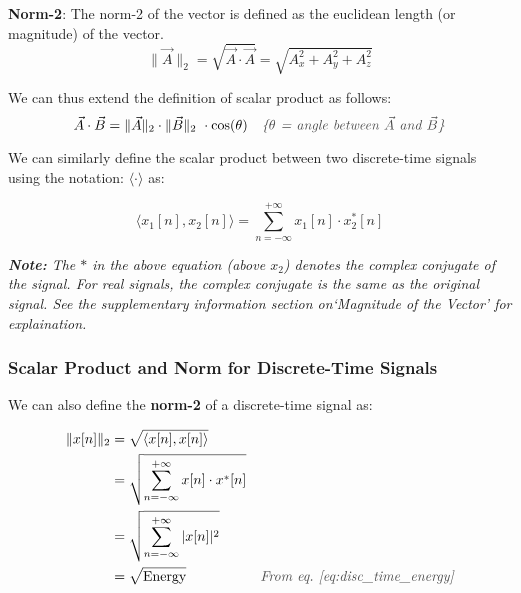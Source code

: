 \documentclass[letterpaper,12pt]{article}
\newcommand{\annot}[1]{\textcolor{darkgray}{\textit{#1}}}
\begin{document}
\textbf{Norm-2}: The norm-2 of the vector is defined as the euclidean length (or magnitude) of the vector.
\[\| \Vec{A} \|_2 = \sqrt{\Vec{A} \cdot \Vec{A}} = \sqrt{A_{x}^2 + A_{y}^2 + A_{z}^2}\]

We can thus extend the definition of scalar product as follows:
\[\Vec{A}\cdot\Vec{B} = \| \Vec{A} \|_2 \cdot \| \Vec{B} \|_2\ \cdot \cos(\theta) \quad \text{\annot{\{$\theta$ = angle between $\Vec{A}$ and $\Vec{B}$\}}}\]

We can similarly define the scalar product between two discrete-time signals using the notation: $\langle \cdot \rangle$ as:

\begin{equation}
    \label{eq:scalar_product_discrete_time}
    \langle x_{1}[n], x_{2}[n] \rangle = \sum_{n=-\infty}^{+\infty} x_{1}[n] \cdot x_{2}^{*}[n]
\end{equation}

\textit{\textbf{Note:} The $*$ in the above equation (above $x_{2}$) denotes the complex conjugate of the signal. For real signals, the complex conjugate is the same as the original signal. See the supplementary information section on`Magnitude of the Vector' for explaination.}

\vspace{0.5cm}

\subsubsection*{Scalar Product and Norm for Discrete-Time Signals}

We can also define the \textbf{norm-2} of a discrete-time signal as:

\begin{equation}
    \begin{aligned}
        \| x[n] \|_2 & = \sqrt{\langle x[n], x[n] \rangle}                                                                         \\
                     & = \sqrt{\sum_{n=-\infty}^{+\infty} x[n] \cdot x^{*}[n]}                                                     \\
                     & = \sqrt{\sum_{n=-\infty}^{+\infty}|x[n]|^{2}}                                                               \\
                     & = \sqrt{\text{Energy}}                                  & \annot{\text{From eq.~\ref{eq:disc_time_energy}}}
    \end{aligned}
    \label{eq:norm_discrete_time}
\end{equation}
\end{document}

